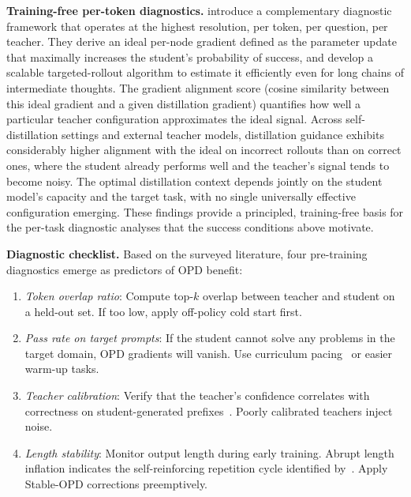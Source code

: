 \documentclass{article} %
\begin{document}
\textbf{Training-free per-token diagnostics.} \citet{2605.10889} introduce a complementary diagnostic framework that operates at the highest resolution, per token, per question, per teacher. They derive an ideal per-node gradient defined as the parameter update that maximally increases the student's probability of success, and develop a scalable targeted-rollout algorithm to estimate it efficiently even for long chains of intermediate thoughts. The gradient alignment score (cosine similarity between this ideal gradient and a given distillation gradient) quantifies how well a particular teacher configuration approximates the ideal signal. Across self-distillation settings and external teacher models, distillation guidance exhibits considerably higher alignment with the ideal on incorrect rollouts than on correct ones, where the student already performs well and the teacher's signal tends to become noisy. The optimal distillation context depends jointly on the student model's capacity and the target task, with no single universally effective configuration emerging. These findings provide a principled, training-free basis for the per-task diagnostic analyses that the success conditions above motivate.

\textbf{Diagnostic checklist.} Based on the surveyed literature, four pre-training diagnostics emerge as predictors of OPD benefit:
\begin{enumerate}[nosep]
    \item \textit{Token overlap ratio}: Compute top-$k$ overlap between teacher and student on a held-out set. If too low, apply off-policy cold start first.
    \item \textit{Pass rate on target prompts}: If the student cannot solve any problems in the target domain, OPD gradients will vanish. Use curriculum pacing~\citep{2603.11178} or easier warm-up tasks.
    \item \textit{Teacher calibration}: Verify that the teacher's confidence correlates with correctness on student-generated prefixes~\citep{2604.16830}. Poorly calibrated teachers inject noise.
    \item \textit{Length stability}: Monitor output length during early training. Abrupt length inflation indicates the self-reinforcing repetition cycle identified by~\citet{2604.08527}. Apply Stable-OPD corrections preemptively.
\end{enumerate}
\end{document}
